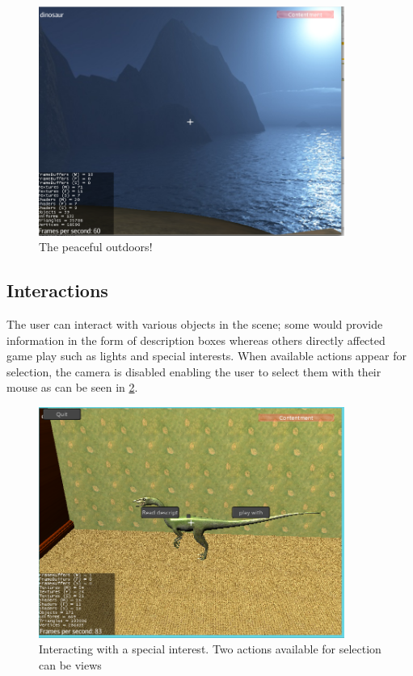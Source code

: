 \begin{figure}[H]
\centering
\includegraphics[width=100mm]{images/prototype/outside.png}
\caption{The peaceful outdoors!}
\label{prototype_kitchen1}
\end{figure}

\subsection*{Interactions}

The user can interact with various objects in the scene; some would provide information in the form of description boxes whereas others directly affected game play such as lights and special interests. When available actions appear for selection, the camera is disabled enabling the user to select them with their mouse as can be seen in \ref{prototype_dino}.

\begin{figure}[H]
\centering
\includegraphics[width=100mm]{images/prototype/si.png}
\caption{Interacting with a special interest. Two actions available for selection can be views}
\label{prototype_dino}
\end{figure}

